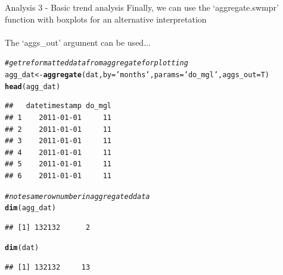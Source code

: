 \documentclass[xcolor=svgnames]{beamer}\usepackage[]{graphicx}\usepackage[]{color}
\makeatletter
\newcommand{\hlstr}[1]{\textcolor[rgb]{0.192,0.494,0.8}{#1}}%
\newcommand{\hlcom}[1]{\textcolor[rgb]{0.678,0.584,0.686}{\textit{#1}}}%
\newcommand{\hlstd}[1]{\textcolor[rgb]{0.345,0.345,0.345}{#1}}%
\newcommand{\hlkwb}[1]{\textcolor[rgb]{0.69,0.353,0.396}{#1}}%
\newcommand{\hlkwc}[1]{\textcolor[rgb]{0.333,0.667,0.333}{#1}}%
\newcommand{\hlkwd}[1]{\textcolor[rgb]{0.737,0.353,0.396}{\textbf{#1}}}%
\newenvironment{kframe}{%
 \def\at@end@of@kframe{}%
 \ifinner\ifhmode%
  \def\at@end@of@kframe{\end{minipage}}%
  \begin{minipage}{\columnwidth}%
 \fi\fi%
 \def\FrameCommand##1{\hskip\@totalleftmargin \hskip-\fboxsep
 \colorbox{shadecolor}{##1}\hskip-\fboxsep
     \hskip-\linewidth \hskip-\@totalleftmargin \hskip\columnwidth}%
 \MakeFramed {\advance\hsize-\width
   \@totalleftmargin\z@ \linewidth\hsize
   \@setminipage}}%
 {\par\unskip\endMakeFramed%
 \at@end@of@kframe}
\newenvironment{knitrout}{}{} %
\makeatother
\begin{document}
\begin{frame}[containsverbatim]{Analysis 3 - Basic trend analysis}
Finally, we can use the `aggregate.swmpr' function with boxplots for an alternative interpretation \\~\\
The `aggs\_out' argument can be used...
\begin{knitrout}\scriptsize
{}\color{fgcolor}\begin{kframe}
\begin{alltt}
\hlcom{# get reformatted data from aggregate for plotting}
\hlstd{agg_dat} \hlkwb{<-} \hlkwd{aggregate}\hlstd{(dat,} \hlkwc{by} \hlstd{=} \hlstr{'months'}\hlstd{,} \hlkwc{params} \hlstd{=} \hlstr{'do_mgl'}\hlstd{,} \hlkwc{aggs_out} \hlstd{= T)}
\hlkwd{head}\hlstd{(agg_dat)}
\end{alltt}
\begin{verbatim}
##   datetimestamp do_mgl
## 1    2011-01-01     11
## 2    2011-01-01     11
## 3    2011-01-01     11
## 4    2011-01-01     11
## 5    2011-01-01     11
## 6    2011-01-01     11
\end{verbatim}
\begin{alltt}
\hlcom{# note same row number in aggregated data}
\hlkwd{dim}\hlstd{(agg_dat)}
\end{alltt}
\begin{verbatim}
## [1] 132132      2
\end{verbatim}
\begin{alltt}
\hlkwd{dim}\hlstd{(dat)}
\end{alltt}
\begin{verbatim}
## [1] 132132     13
\end{verbatim}
\end{kframe}
\end{knitrout}
\end{frame}
\end{document}
